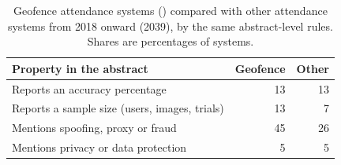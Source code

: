 \begin{table}[tbp]\centering\small
\caption{Geofence attendance systems (\nAudit{}) compared with other attendance systems from 2018 onward (2039), by the same abstract-level rules. Shares are percentages of systems.}\label{tab:compare}
\begin{tabular}{@{}lrr@{}}\toprule Property in the abstract & Geofence & Other \\ \midrule
Reports an accuracy percentage & 13 & 13 \\
Reports a sample size (users, images, trials) & 13 & 7 \\
Mentions spoofing, proxy or fraud & 45 & 26 \\
Mentions privacy or data protection & 5 & 5 \\
\bottomrule\end{tabular}\end{table}
